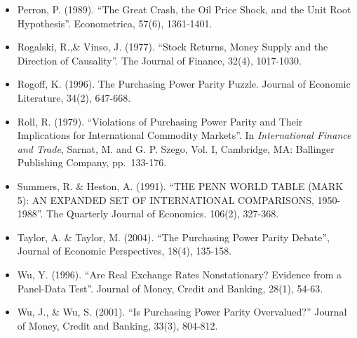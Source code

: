 \documentclass[]{article}
\begin{document}
\begin{itemize}
\item
  Perron, P. (1989). ``The Great Crash, the Oil Price Shock, and the Unit Root Hypothesis''. Econometrica, 57(6), 1361-1401.
\item
  Rogalski, R.,\& Vinso, J. (1977). ``Stock Returns, Money Supply and the Direction of Causality''. The Journal of Finance, 32(4), 1017-1030.
\item
  Rogoff, K. (1996). The Purchasing Power Parity Puzzle. Journal of Economic Literature, 34(2), 647-668.
\item
  Roll, R. (1979). ``Violations of Purchasing Power Parity and Their Implications for International Commodity Markets''. In \emph{International Finance and Trade}, Sarnat, M. and G. P. Szego, Vol. I, Cambridge, MA: Ballinger Publishing Company, pp.~133-176.
\item
  Summers, R. \& Heston, A. (1991). ``THE PENN WORLD TABLE (MARK 5): AN EXPANDED SET OF INTERNATIONAL COMPARISONS, 1950-1988''. The Quarterly Journal of Economics. 106(2), 327-368.
\item
  Taylor, A. \& Taylor, M. (2004). ``The Purchasing Power Parity Debate'', Journal of Economic Perspectives, 18(4), 135-158.
\item
  Wu, Y. (1996). ``Are Real Exchange Rates Nonstationary? Evidence from a Panel-Data Test''. Journal of Money, Credit and Banking, 28(1), 54-63.
\item
  Wu, J., \& Wu, S. (2001). ``Is Purchasing Power Parity Overvalued?'' Journal of Money, Credit and Banking, 33(3), 804-812.
\end{itemize}
\end{document}
